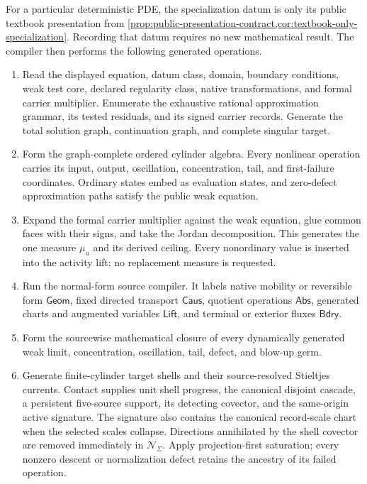 \documentclass[11pt]{article}
\numberwithin{section}{part}
\theoremstyle{plain}
\theoremstyle{definition}
\theoremstyle{remark}
\newcommand{\Geom}{\mathsf{Geom}}
\newcommand{\Caus}{\mathsf{Caus}}
\newcommand{\Abs}{\mathsf{Abs}}
\newcommand{\Lift}{\mathsf{Lift}}
\newcommand{\Bdry}{\mathsf{Bdry}}
\newcommand{\Null}{\mathscr N}
\begin{document}
For a particular deterministic PDE, the specialization datum is only its
public textbook presentation from
\cref{prop:public-presentation-contract,cor:textbook-only-specialization}.
Recording that datum requires no new mathematical result.  The compiler then
performs the following generated operations.
\begin{enumerate}[label=\textup{(I\arabic*)}]
\item Read the displayed equation, datum class, domain, boundary conditions,
  weak test core, declared regularity class, native transformations, and
  formal carrier multiplier.  Enumerate the exhaustive rational approximation
  grammar, its tested residuals, and its signed carrier records.  Generate the
  total solution graph, continuation graph, and complete singular target.
\item Form the graph-complete ordered cylinder algebra.  Every nonlinear
  operation carries its input, output, oscillation, concentration, tail, and
  first-failure coordinates.  Ordinary states embed as evaluation states, and
  zero-defect approximation paths satisfy the public weak equation.
\item Expand the formal carrier multiplier against the weak equation, glue
  common faces with their signs, and take the Jordan decomposition.  This
  generates the one measure \(\mu_u\) and its derived ceiling.  Every
  nonordinary value is inserted into the activity lift; no replacement
  measure is requested.
\item Run the normal-form source compiler.  It labels native mobility or
  reversible form \(\Geom\), fixed directed transport \(\Caus\), quotient
  operations \(\Abs\), generated charts and augmented variables \(\Lift\),
  and terminal or exterior fluxes \(\Bdry\).
\item Form the sourcewise mathematical closure of every dynamically generated
  weak limit, concentration, oscillation, tail, defect, and blow-up germ.
\item Generate finite-cylinder target shells and their source-resolved
  Stieltjes currents.  Contact supplies unit shell progress, the canonical
  disjoint cascade, a persistent five-source support, its detecting covector,
  and the same-origin active signature.  The signature also contains the
  canonical record-scale chart when the selected scales collapse.  Directions
  annihilated by the shell covector are removed immediately in
  \(\Null_\Sigma\).  Apply projection-first saturation; every nonzero descent
  or normalization defect retains the ancestry of its failed operation.

\end{enumerate}
\end{document}
